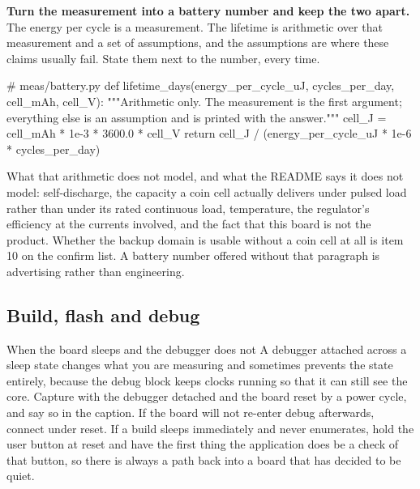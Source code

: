 \begin{steps}
\item \textbf{Turn the measurement into a battery number and keep the two
apart.} The energy per cycle is a measurement. The lifetime is arithmetic over
that measurement and a set of assumptions, and the assumptions are where these
claims usually fail. State them next to the number, every time.
\begin{pycode}
# meas/battery.py
def lifetime_days(energy_per_cycle_uJ, cycles_per_day, cell_mAh, cell_V):
    """Arithmetic only. The measurement is the first argument; everything
    else is an assumption and is printed with the answer."""
    cell_J = cell_mAh * 1e-3 * 3600.0 * cell_V
    return cell_J / (energy_per_cycle_uJ * 1e-6 * cycles_per_day)
\end{pycode}
What that arithmetic does not model, and what the README says it does not model:
self-discharge, the capacity a coin cell actually delivers under pulsed load
rather than under its rated continuous load, temperature, the regulator's
efficiency at the currents involved, and the fact that this board is not the
product. Whether the backup domain is usable without a coin cell at all is item
10 on the confirm list. A battery number offered without that paragraph is
advertising rather than engineering.
\end{steps}

\subsection*{Build, flash and debug}



\begin{note}{When the board sleeps and the debugger does not}
A debugger attached across a sleep state changes what you are measuring and
sometimes prevents the state entirely, because the debug block keeps clocks
running so that it can still see the core. Capture with the debugger detached
and the board reset by a power cycle, and say so in the caption. If the board
will not re-enter debug afterwards, connect under reset. If a build sleeps
immediately and never enumerates, hold the user button at reset and have the
first thing the application does be a check of that button, so there is always a
path back into a board that has decided to be quiet.
\end{note}

